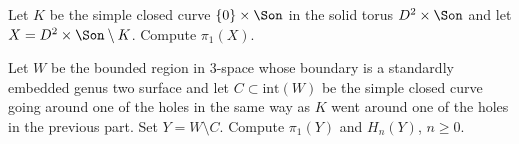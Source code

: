 \begin{alist}
\item Let $K$ be the simple closed curve $\{0\}\times \Son$ in the
solid torus $D^2\times \Son$ and let $X=D^2\times \Son \setminus K$.
Compute $\pi_1(X)$.
\item Let $W$ be the bounded region in 3-space whose boundary is a
standardly embedded genus two surface and let $C\subset
\mathrm{int}(W)$ be the simple closed curve going around one of the
holes in the same way as $K$ went around one of the holes in the
previous part. Set $Y=W \setminus C$. Compute $\pi_1(Y)$ and $H_n(Y)$,
$n\geq 0$.
\end{alist}
